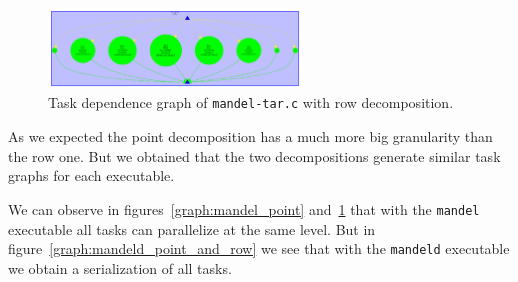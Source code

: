 \begin{figure}[H]
\centering
\includegraphics[width=0.6\textwidth]{plots/dependency_graph_mandel_row.pdf}
\caption{Task dependence graph of \texttt{mandel-tar.c} with row decomposition.}
\label{graph:mandel_row}
\end{figure}


As we expected the point decomposition has a much more big granularity than the row one. But we obtained that the two decompositions generate similar task graphs for each executable.

We can observe in figures~\ref{graph:mandel_point} and~\ref{graph:mandel_row} that with the \texttt{mandel} executable all tasks can parallelize at the same level. But in figure~\ref{graph:mandeld_point_and_row} we see that with the \texttt{mandeld} executable we obtain a serialization of all tasks.

